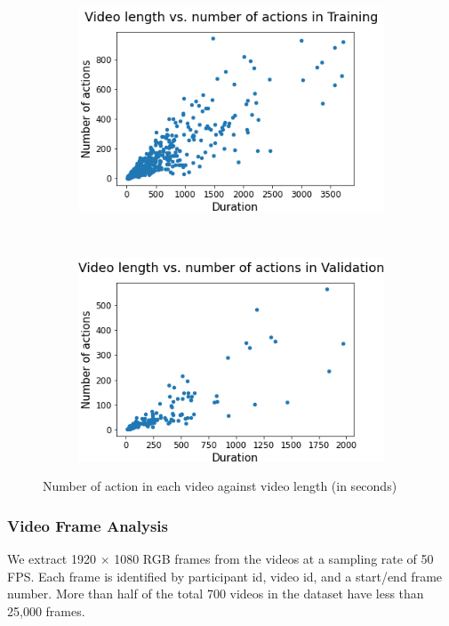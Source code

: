 \begin{figure}[t!]
        \begin{subfigure}[b]{0.475\textwidth}
            \centering
            \includegraphics[scale=0.42]{figures/length_vs_actions_Training.png}
        \end{subfigure}\\
        \begin{subfigure}[b]{0.475\textwidth}
            \centering
            \includegraphics[scale=0.42]{figures/length_vs_actions_Validation.png}
        \end{subfigure}
        \caption{Number of action in each video against video length (in seconds)}
        \label{fig:action-freq-video-length}
\end{figure}

\subsubsection{Video Frame Analysis}
We extract 1920 $\times$ 1080 RGB frames from the videos at a sampling rate of 50 FPS. Each frame is identified by participant id, video id, and a start/end frame number. More than half of the total 700 videos in the dataset have less than 25,000 frames.  

